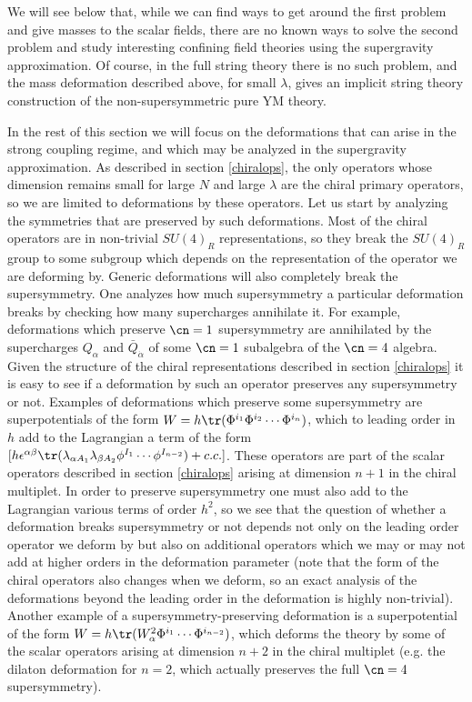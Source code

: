  We will see below that, while we can find ways to get around the first
 problem and give masses to the scalar fields, there are no known ways
 to solve the second problem and study interesting confining field
 theories using the supergravity approximation. Of course, in the full
 string theory there is no such problem, and the mass deformation
 described above, for small $\lambda$, gives an implicit string theory
 construction of the non-supersymmetric pure YM theory.

 In the rest of this section we will focus on the deformations that
 can arise in the strong coupling regime, and which may be analyzed in
 the supergravity approximation. As described in section
 \ref{chiralops}, the only operators whose dimension remains small for
 large $N$ and large $\lambda$ are the chiral primary operators, so we
 are limited to deformations by these operators. Let us start by
 analyzing the symmetries that are preserved by such
 deformations. Most of the chiral operators are in non-trivial
 $SU(4)_R$ representations, so they break the $SU(4)_R$ group to some
 subgroup which depends on the representation of the operator we are
 deforming by. Generic deformations will also completely break the
 supersymmetry. One analyzes how much supersymmetry a particular
 deformation breaks by checking how many supercharges annihilate
 it. For example, deformations which preserve $\cn=1$ supersymmetry
 are annihilated by the supercharges $Q_\alpha$ and ${\bar
 Q}_{\dot{\alpha}}$ of some $\cn=1$ subalgebra of the $\cn=4$
 algebra. Given the structure of the chiral representations described
 in section \ref{chiralops} it is easy to see if a deformation by such
 an operator preserves any supersymmetry or not. Examples of
 deformations which preserve some supersymmetry are superpotentials of
 the form $W=h\tr(\Phi^{i_1} \Phi^{i_2} \cdots \Phi^{i_n})$, which to
 leading order in $h$ add to the Lagrangian a term of the form
 $[h\epsilon^{\alpha \beta} \tr(\lambda_{\alpha A_1} \lambda_{\beta
 A_2} \phi^{I_1} \cdots \phi^{I_{n-2}}) + c.c.]$. These operators are
 part of the scalar operators described in section \ref{chiralops}
 arising at dimension $n+1$ in the chiral multiplet. In order to
 preserve supersymmetry one must also add to the Lagrangian various
 terms of order $h^2$, so we see that the question of whether a
 deformation breaks supersymmetry or not depends not only on the
 leading order operator we deform by but also on additional operators
 which we may or may not add at higher orders in the deformation
 parameter (note that the form of the chiral operators also changes
 when we deform, so an exact analysis of the deformations beyond the
 leading order in the deformation is highly non-trivial). Another
 example of a supersymmetry-preserving deformation is a superpotential
 of the form $W=h\tr(W_{\alpha}^2 \Phi^{i_1} \cdots \Phi^{i_{n-2}})$,
 which deforms the theory by some of the scalar operators arising at
 dimension $n+2$ in the chiral multiplet (e.g. the dilaton deformation
 for $n=2$, which actually preserves the full $\cn=4$ supersymmetry).

